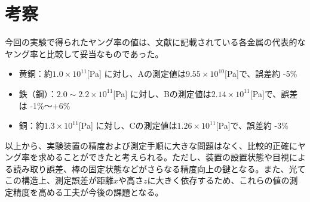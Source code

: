 \documentclass[a4paper,11pt,dvipdfmx]{jsarticle}
\begin{document}
\section{考察}
今回の実験で得られたヤング率の値は、文献に記載されている各金属の代表的なヤング率と比較して妥当なものであった。
\begin{itemize}
  \item 黄銅：約\( 1.0 \times 10^{11} \)[Pa] に対し、Aの測定値は\( 9.55 \times 10^{10} \)[Pa]で、誤差約 -5\%
  \item 鉄（鋼）：\( 2.0 \sim 2.2 \times 10^{11} \)[Pa] に対し、Bの測定値は\( 2.14 \times 10^{11} \)[Pa]で、誤差は -1\%〜+6\%
  \item 銅：約\( 1.3 \times 10^{11} \)[Pa] に対し、Cの測定値は\( 1.26 \times 10^{11} \)[Pa]で、誤差約 -3\%
\end{itemize}

以上から、実験装置の精度および測定手順に大きな問題はなく、比較的正確にヤング率を求めることができたと考えられる。ただし、装置の設置状態や目視による読み取り誤差、棒の固定状態などがさらなる精度向上の鍵となる。また、光てこの構造上、測定誤差が距離\( x \)や高さ\( z \)に大きく依存するため、これらの値の測定精度を高める工夫が今後の課題となる。
\end{document}
